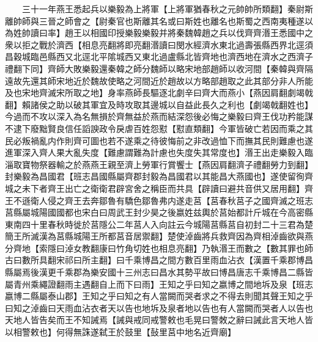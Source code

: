 　　三十一年燕王悉起兵以樂毅為上將軍【上將軍猶春秋之元帥帥所類翻】秦尉斯離帥師與三晉之師會之【尉秦官也斯離其名或曰斯姓也離名也斯蜀之西南夷種遂以為姓帥讀曰率】趙王以相國印授樂毅樂毅并將秦魏韓趙之兵以伐齊齊湣王悉國中之衆以拒之戰於濟西【相息亮翻將即亮翻湣讀曰閔水經濟水東北過壽張縣西界北逕須昌穀城臨邑縣西又北逕北平隂城西又東北過盧縣北皆齊地也濟西地在濟水之西濟子禮翻下同】齊師大敗樂毅還秦韓之師分魏師以略宋地部趙師以收河間【秦韓與齊隔遠故先還其師宋地近於魏故使略之河間近於趙故以方略部趙取之此其部分非人所能及也宋地齊滅宋所取之地】身率燕師長驅逐北劇辛曰齊大而燕小【燕因肩翻劇竭戟翻】賴諸侯之助以破其軍宜及時攻取其邊城以自益此長久之利也【劇竭戟翻姓也】今過而不攻以深入為名無損於齊無益於燕而結深怨後必悔之樂毅曰齊王伐功矜能謀不逮下廢黜賢良信任謟諛政令戾虐百姓怨懟【懟直類翻】今軍皆破亡若因而乘之其民必叛禍亂内作則齊可圖也若不遂乘之待彼悔前之非改過恤下而撫其民則難慮也遂進軍深入齊人果大亂失度【難慮謂難為計慮也失度失其常度也】湣王出走樂毅入臨淄取寶物祭器輸之於燕燕王親至濟上勞軍行賞饗士【燕因肩翻濟子禮翻勞力到翻】封樂毅為昌國君【班志昌國縣屬齊郡封毅為昌國君以其能昌大燕國也】遂使留徇齊城之未下者齊王出亡之衛衛君辟宮舍之稱臣而共具【辟讀曰避共音供又居用翻】齊王不遜衛人侵之齊王去奔鄒魯有驕色鄒魯弗内遂走莒【莒春秋莒子之國齊滅之班志莒縣屬城陽國國都也宋白曰周武王封少昊之後嬴姓兹輿於莒始都計斤城在今高密縣東南四十里春秋時徙於莒隱公二年莒人入向註云今城陽莒縣莒自初封二十三君為楚簡王所滅漢為莒縣城陽王所都莒音居禦翻】楚使淖齒將兵救齊因為齊相淖齒欲與燕分齊地【索隱曰淖女教翻康曰竹角切姓也相息亮翻】乃執湣王而數之【數其罪也師古曰數所具翻宋祁曰所主翻】曰千乘博昌之間方數百里雨血沾衣【漢置千乘郡博昌縣屬焉後漢更千乘郡為樂安國十三州志曰昌水其勢平故曰博昌唐志千乘博昌二縣皆屬青州乘繩證翻雨主遇翻自上而下曰雨】王知之乎曰知之嬴博之間地坼及泉【班志嬴博二縣屬泰山郡】王知之乎曰知之有人當闕而哭者求之不得去則聞其聲王知之乎曰知之淖齒曰天雨血沾衣者天以告也地坼及泉者地以告也有人當闕而哭者人以告也天地人皆告矣而王不知誡焉【誡與戒同戒警敕也毛晃曰警敇之辭曰誡此言天地人皆以相警敕也】何得無誅遂弑王於鼓里【鼔里莒中地名近齊廟】

